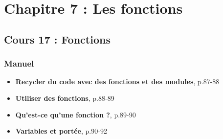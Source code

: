 \documentclass[11pt]{article}
\begin{document}
\section*{Chapitre 7 : Les fonctions}
\label{chapitre7}
\subsection*{Cours 17 : Fonctions}
\label{chapitre7_cours17}
\subsubsection*{Manuel}
\label{sec:org7bae705}
\begin{itemize}
\item \textbf{\og Recycler du code avec des fonctions et des modules\fg{}}, p.87-88
\item \textbf{\og Utiliser des fonctions\fg{}}, p.88-89
\item \textbf{\og Qu'est-ce qu'une fonction ?\fg{}}, p.89-90
\item \textbf{\og Variables et portée\fg{}}, p.90-92
\end{itemize}
\end{document}
